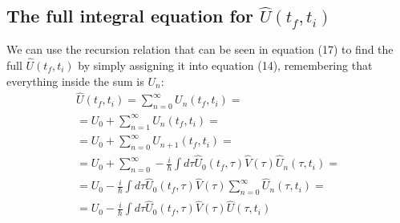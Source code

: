 \documentclass{article}
\begin{document}
\subsection{The full integral equation for $\hat{U}(t_f, t_i)$}
We can use the recursion relation that can be seen in equation (17) to find the full $\hat{U}(t_f, t_i)$ by simply assigning it into equation (14), remembering that everything inside the sum is $U_n$:
\begin{equation}
\begin{gathered}
    \hat{U}(t_f, t_i) = \sum_{n=0}^\infty U_n(t_f, t_i) =
    \\
    = U_0 + \sum_{n=1}^\infty U_n(t_f, t_i) =
    \\
    = U_0 + \sum_{n=0}^\infty U_{n+1}(t_f, t_i) =
    \\
    = U_0 + \sum_{n=0}^\infty -
    \frac{i}{\hbar}
    \int d\tau
    \hat{U}_0 (t_f, \tau)
    \hat{V}(\tau)
    \hat{U}_n (\tau, t_i) =
    \\
    = U_0 - \frac{i}{\hbar}
    \int d\tau
    \hat{U}_0 (t_f, \tau)
    \hat{V}(\tau)
    \sum_{n=0}^\infty \hat{U}_n (\tau, t_i) =
    \\
    = U_0 - \frac{i}{\hbar}
    \int d\tau
    \hat{U}_0 (t_f, \tau)
    \hat{V}(\tau)
    \hat{U} (\tau, t_i)
\end{gathered}
\end{equation}

\newpage
\end{document}
